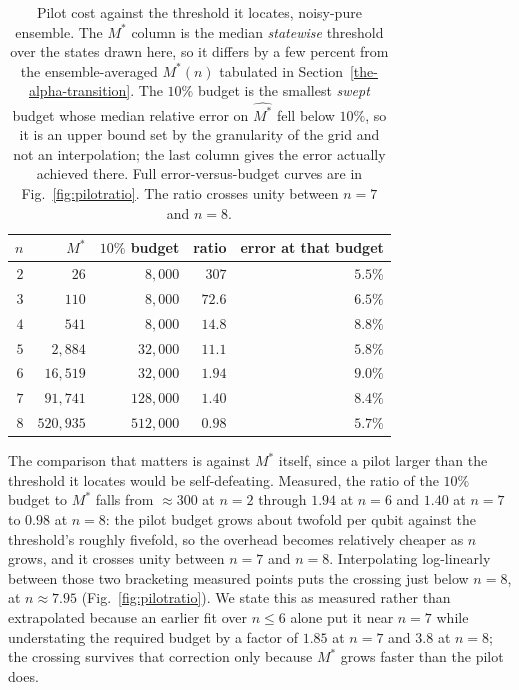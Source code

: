 \documentclass[a4paper,superscriptaddress,nofootinbib,onecolumn,nopdfoutputerror]{quantumarticle}
\begin{document}
\begin{table}[htbp]
\centering
\setlength{\tabcolsep}{9pt}
\begin{tabular}{@{}rrrrr@{}}
\toprule
\(n\) & \(M^*\) & \(10\%\) budget & ratio & error at that budget \\
\midrule
\(2\) & \(26\)        & \(8{,}000\)   & \(307\)   & \(5.5\%\) \\
\(3\) & \(110\)       & \(8{,}000\)   & \(72.6\)  & \(6.5\%\) \\
\(4\) & \(541\)       & \(8{,}000\)   & \(14.8\)  & \(8.8\%\) \\
\(5\) & \(2{,}884\)   & \(32{,}000\)  & \(11.1\)  & \(5.8\%\) \\
\(6\) & \(16{,}519\)  & \(32{,}000\)  & \(1.94\)  & \(9.0\%\) \\
\(7\) & \(91{,}741\)  & \(128{,}000\) & \(1.40\)  & \(8.4\%\) \\
\(8\) & \(520{,}935\) & \(512{,}000\) & \(0.98\)  & \(5.7\%\) \\
\bottomrule
\end{tabular}
\caption{Pilot cost against the threshold it locates, noisy-pure ensemble. The \(M^*\) column is the median \emph{statewise} threshold over the states drawn here, so it differs by a few percent from the ensemble-averaged \(M^*(n)\) tabulated in Section~\ref{the-alpha-transition}. The \(10\%\) budget is the smallest \emph{swept} budget whose median relative error on \(\widehat{M^*}\) fell below \(10\%\), so it is an upper bound set by the granularity of the grid and not an interpolation; the last column gives the error actually achieved there. Full error-versus-budget curves are in Fig.~\ref{fig:pilotratio}. The ratio crosses unity between \(n = 7\) and \(n = 8\).}
\label{tab:pilot}
\end{table}

The comparison that matters is against \(M^*\) itself, since a pilot larger than the threshold it
locates would be self-defeating. Measured, the ratio of the \(10\%\) budget to \(M^*\) falls from
\(\approx\!300\) at \(n = 2\) through \(1.94\) at \(n = 6\) and \(1.40\) at \(n = 7\) to
\(0.98\) at \(n = 8\): the pilot budget grows about twofold per qubit against the threshold's
roughly fivefold, so the overhead becomes relatively cheaper as \(n\) grows, and it crosses unity
between \(n = 7\) and \(n = 8\). Interpolating log-linearly between those two bracketing measured
points puts the crossing just below \(n = 8\), at \(n \approx 7.95\)
(Fig.~\ref{fig:pilotratio}). We state this as
measured rather than extrapolated because an earlier fit over \(n \le 6\) alone put it near
\(n = 7\) while understating the required budget by a factor of \(1.85\) at \(n = 7\) and
\(3.8\) at \(n = 8\); the crossing survives that correction only because \(M^*\) grows
faster than the pilot does.
\end{document}
